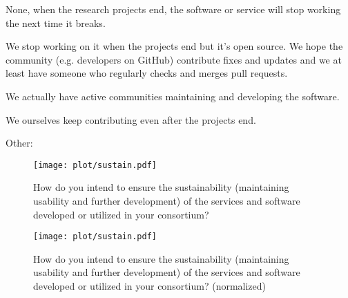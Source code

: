 \documentclass[headsepline,titlepage,twoside,12pt,toc=flat,headings=normal]{scrreprt}
\newcommand{\otherbox}{\fbox{\phantom{This is how big an answer would be.}}}
\begin{document}
\begin{answers}
\item None, when the research projects end, the software or service will stop working the next time it breaks.
\item We stop working on it when the projects end but it's
  open source.
We hope the community (e.g. developers on GitHub)
  contribute fixes and updates and we at least have someone who
  regularly checks and merges pull requests.
\item We actually have active communities maintaining and developing the
  software.
\item We ourselves keep contributing even after the projects end.
\item Other: \otherbox
\end{answers}

\begin{figure}[h!]
\caption{How do you intend to ensure the sustainability (maintaining usability and further development) of the services and software developed or utilized in your consortium?}
\label{fig:sustain}
\texttt{[image: plot/sustain.pdf]}
\end{figure}

\begin{figure}[h!]
\caption{How do you intend to ensure the sustainability (maintaining usability and further development) of the services and software developed or utilized in your consortium? (normalized)}
\label{fig:sustain_n}
\texttt{[image: plot/sustain.pdf]}
\end{figure}
\end{document}
